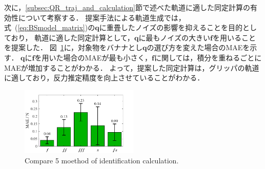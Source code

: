 \documentclass[a4paper]{jarticle}
\begin{document}
次に，\ref{subsec:QR_traj_and_calculation}節で述べた軌道に適した同定計算の有効性について考察する．
提案手法による軌道生成では，式~(\ref{eq:BSmodel_matrix})の$\mathbf{q}$に重畳したノイズの影響を抑えることを目的としており，
軌道に適した同定計算として，$\mathbf{q}$に最もノイズの大きい$\boldsymbol{f}$を用いることを提案した．
図~\ref{fig:compare_select5mode}に，対象物をバナナとし$\mathbf{q}$の選び方を変えた場合のMAEを示す．
$\mathbf{q}$に$\boldsymbol{f}$を用いた場合のMAEが最も小さく，$\boldsymbol{{f}}$に関しては，積分を重ねるごとにMAEが増加することがわかる．
よって，提案した同定計算は，グリッパの軌道に適しており，反力推定精度を向上させていることがわかる．
\begin{figure}[t]
    \centering
    \includegraphics[width=0.5\textwidth]{select_differet_q_chicken.pdf}
    \captionsetup{width=0.9\linewidth} %
    \caption{Compare 5 moethod of identification calculation.}
    \label{fig:compare_select5mode}
\end{figure}
\end{document}
